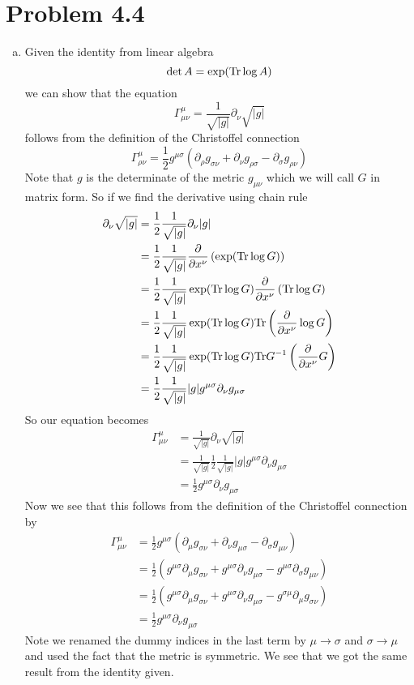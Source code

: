 \documentclass[11pt]{article}
\numberwithin{equation}{section}
\newcommand{\HWnum}{4}
\begin{document}
\section{Problem \HWnum.4}
\begin{enumerate}[(a)]
\item
Given the identity from linear algebra 
$$\det A = \exp(\textnormal{Tr}\log A)$$ 
we can show that the equation
$$\Gamma^{\mu}_{\mu\nu} = \frac{1}{\sqrt{|g|}}\partial_{\nu}\sqrt{|g|}$$
follows from the definition of the Christoffel connection
$$\Gamma^{\mu}_{\rho\nu} = \frac{1}{2}g^{\mu\sigma}\left(\partial_{\rho}g_{\sigma\nu}+\partial_{\nu}g_{\rho\sigma} - \partial_{\sigma}g_{\rho\nu}\right)$$
Note that $g$ is the determinate of the metric $g_{\mu\nu}$ which we will call $G$ in matrix form. So if we find the derivative using chain rule
\begin{align*}
\partial_{\nu}\sqrt{|g|} &= \frac{1}{2}\frac{1}{\sqrt{|g|}}\partial_{\nu}|g|\\
&= \frac{1}{2}\frac{1}{\sqrt{|g|}}\frac{\partial}{\partial x^{\nu}}\left(\exp(\textnormal{Tr}\log G)\right)\\
&= \frac{1}{2}\frac{1}{\sqrt{|g|}}\exp(\textnormal{Tr}\log G)\frac{\partial}{\partial x^{\nu}}\left(\textnormal{Tr}\log G\right)\\
&= \frac{1}{2}\frac{1}{\sqrt{|g|}}\exp(\textnormal{Tr}\log G)\textnormal{Tr}\left(\frac{\partial}{\partial x^{\nu}}\log G\right)\\
&= \frac{1}{2}\frac{1}{\sqrt{|g|}}\exp(\textnormal{Tr}\log G)\textnormal{Tr}G^{-1}\left(\frac{\partial}{\partial x^{\nu}}G\right)\\
&= \frac{1}{2}\frac{1}{\sqrt{|g|}}|g|g^{\mu\sigma}\partial_{\nu}g_{\mu\sigma}
\end{align*}
So our equation becomes
\begin{align*}
\Gamma^{\mu}_{\mu\nu} &= \frac{1}{\sqrt{|g|}}\partial_{\nu}\sqrt{|g|}\\
&= \frac{1}{\sqrt{|g|}}\frac{1}{2}\frac{1}{\sqrt{|g|}}|g|g^{\mu\sigma}\partial_{\nu}g_{\mu\sigma}\\
&= \frac{1}{2}g^{\mu\sigma}\partial_{\nu}g_{\mu\sigma}
\end{align*}
Now we see that this follows from the definition of the Christoffel connection by
\begin{align*}
\Gamma^{\mu}_{\mu\nu} &= \frac{1}{2}g^{\mu\sigma}\left(\partial_{\mu}g_{\sigma\nu}+\partial_{\nu}g_{\mu\sigma} - \partial_{\sigma}g_{\mu\nu}\right)\\
&= \frac{1}{2}\left(g^{\mu\sigma}\partial_{\mu}g_{\sigma\nu} + g^{\mu\sigma}\partial_{\nu}g_{\mu\sigma} - g^{\mu\sigma}\partial_{\sigma}g_{\mu\nu}\right)\\
&= \frac{1}{2}\left(g^{\mu\sigma}\partial_{\mu}g_{\sigma\nu} + g^{\mu\sigma}\partial_{\nu}g_{\mu\sigma} - g^{\sigma\mu}\partial_{\mu}g_{\sigma\nu}\right)\\
&= \frac{1}{2}g^{\mu\sigma}\partial_{\nu}g_{\mu\sigma} 
\end{align*}
Note we renamed the dummy indices in the last term by $\mu\rightarrow\sigma$ and $\sigma\rightarrow\mu$ and used the fact that the metric is symmetric. We see that we got the same result from the identity given.


\end{enumerate}
\end{document}
